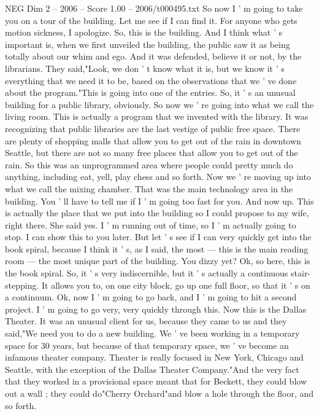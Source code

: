 \begin{textsample}{NEG Dim 2 – 2006 – Score 1.00 – 2006/t000495.txt}
So now I ' m going to take you on a tour of the building.
Let me see if I can find it.
For anyone who gets motion sickness, I apologize.
So, this is the building.
And I think what ' s important is, when we first unveiled the building, the public saw it as being totally about our whim and ego.
And it was defended, believe it or not, by the librarians.
They said,"Look, we don ' t know what it is, but we know it ' s everything that we need it to be, based on the observations that we ' ve done about the program."This is going into one of the entries.
So, it ' s an unusual building for a public library, obviously.
So now we ' re going into what we call the living room.
This is actually a program that we invented with the library.
It was recognizing that public libraries are the last vestige of public free space.
There are plenty of shopping malls that allow you to get out of the rain in downtown Seattle, but there are not so many free places that allow you to get out of the rain.
So this was an unprogrammed area where people could pretty much do anything, including eat, yell, play chess and so forth.
Now we ' re moving up into what we call the mixing chamber.
That was the main technology area in the building.
You ' ll have to tell me if I ' m going too fast for you.
And now up.
This is actually the place that we put into the building so I could propose to my wife, right there.
She said yes.
I ' m running out of time, so I ' m actually going to stop.
I can show this to you later.
But let ' s see if I can very quickly get into the book spiral, because I think it ' s, as I said, the most — this is the main reading room — the most unique part of the building.
You dizzy yet?
Ok, so here, this is the book spiral.
So, it ' s very indiscernible, but it ' s actually a continuous stair- stepping.
It allows you to, on one city block, go up one full floor, so that it ' s on a continuum.
Ok, now I ' m going to go back, and I ' m going to hit a second project.
I ' m going to go very, very quickly through this.
Now this is the Dallas Theater.
It was an unusual client for us, because they came to us and they said,"We need you to do a new building.
We ' ve been working in a temporary space for 30 years, but because of that temporary space, we ' ve become an infamous theater company.
Theater is really focused in New York, Chicago and Seattle, with the exception of the Dallas Theater Company."And the very fact that they worked in a provisional space meant that for Beckett, they could blow out a wall ; they could do"Cherry Orchard"and blow a hole through the floor, and so forth.

\end{textsample}
